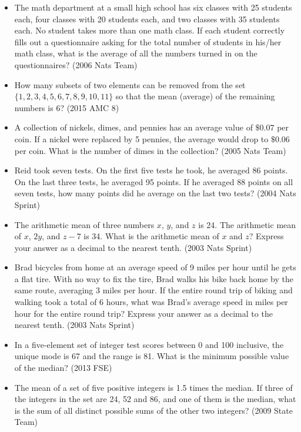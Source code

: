\documentclass{article}
\begin{document}
\begin{itemize}
\item The math department at a small high school has six classes with 25 students each, four classes with 20 students each, and two classes with 35 students each. No student takes more than one math class. If each student correctly fills out a questionnaire asking for the total number of students in his/her math class, what is the average of all the numbers turned in on the questionnaires? (2006 Nats Team)

\item How many subsets of two elements can be removed from the set $\{1, 2, 3, 4, 5, 6, 7, 8, 9, 10, 11\}$ so that the mean (average) of the remaining numbers is $6$? (2015 AMC 8)

\item A collection of nickels, dimes, and pennies has an average value of $\$0.07$ per coin. If a nickel were replaced by 5 pennies, the average would drop to $\$0.06$ per coin. What is the number of dimes in the collection? (2005 Nats Team)

\item Reid took seven tests. On the first five tests he took, he averaged 86 points. On the last three tests, he averaged 95 points. If he averaged 88 points on all seven tests, how many points did he average on the last two tests? (2004 Nats Sprint)

\item The arithmetic mean of three numbers $x$, $y$, and $z$ is 24. The arithmetic mean of $x$, $2y$, and $z-7$ is 34. What is the arithmetic mean of $x$ and $z$? Express your answer as a decimal to the nearest tenth. (2003 Nats Sprint)

\item Brad bicycles from home at an average speed of 9 miles per hour until he gets a flat tire. With no way to fix the tire, Brad walks his bike back home by the same route, averaging 3 miles per hour. If the entire round trip of biking and walking took a total of 6 hours, what was Brad's average speed in miles per hour for the entire round trip? Express your answer as a decimal to the nearest tenth. (2003 Nats Sprint)

\item In a five-element set of integer test scores between 0 and 100 inclusive, the unique mode is 67 and the range is 81. What is the minimum possible value of the median? (2013 FSE)

\item The mean of a set of five positive integers is 1.5 times the median. If three of the integers in the set are 24, 52 and 86, and one of them is the median, what is the sum of all distinct possible sums of the other two integers? (2009 State Team)


\end{itemize}
\end{document}
